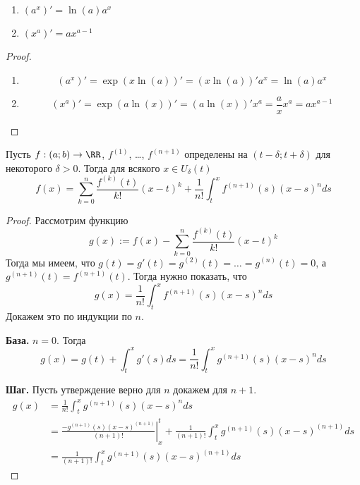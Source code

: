 \documentclass[12pt,a4paper]{article}
\begin{document}
    \begin{theorem}
        \begin{multicols}{2}
            \begin{enumerate}
                \item $(a^x)' = \ln(a)a^x$
                \item $(x^a)' = a x^{a-1}$
            \end{enumerate}
        \end{multicols}
    \end{theorem}

    \begin{proof}\ 
        \begin{enumerate}
            \item \[(a^x)' = \exp(x \ln(a))' = (x \ln(a))' a^x = \ln(a) a^x\]
            \item \[(x^a)' = \exp(a \ln(x))' = (a \ln(x))' x^a = \frac{a}{x} x^a = a x^{a-1}\]
        \end{enumerate}
    \end{proof}

    \begin{theorem}
        Пусть $f: (a; b) \to \RR$, $f^{(1)}$, \dots, $f^{(n+1)}$ определены на $(t-\delta; t+\delta)$ для некоторого $\delta > 0$. Тогда для всякого $x \in U_\delta(t)$
        \[f(x) = \sum_{k=0}^n \frac{f^{(k)}(t)}{k!}(x-t)^k + \frac{1}{n!} \int_t^x f^{(n+1)}(s)(x-s)^n ds\]
    \end{theorem}

    \begin{proof}
        Рассмотрим функцию
        \[g(x) := f(x) - \sum_{k=0}^n \frac{f^{(k)}(t)}{k!}(x-t)^k\]
        Тогда мы имеем, что $g(t) = g'(t) = g^{(2)}(t) = \dots = g^{(n)}(t) = 0$, а $g^{(n+1)}(t) = f^{(n+1)}(t)$. Тогда нужно показать, что
        \[g(x) = \frac{1}{n!} \int_t^x f^{(n+1)}(s)(x-s)^n ds\]
        Докажем это по индукции по $n$.

        \textbf{База.} $n=0$. Тогда
        \[g(x) = g(t) + \int_t^x g'(s)ds = \frac{1}{n!} \int_t^x g^{(n+1)}(s) (x-s)^n ds\]

        \textbf{Шаг.} Пусть утверждение верно для $n$ докажем для $n+1$.
        \begin{align*}
            g(x)
            &= \frac{1}{n!} \int_t^x g^{(n+1)}(s) (x-s)^n ds\\
            &= \left. \frac{-g^{(n+1)}(s) (x-s)^{(n+1)}}{(n+1)!} \right|_x^t
                + \frac{1}{(n+1)!}\int_t^x g^{(n+1)}(s)(x-s)^{(n+1)} ds\\
            &= \frac{1}{(n+1)!}\int_t^x g^{(n+1)}(s)(x-s)^{(n+1)} ds
        \end{align*}
    \end{proof}
\end{document}
